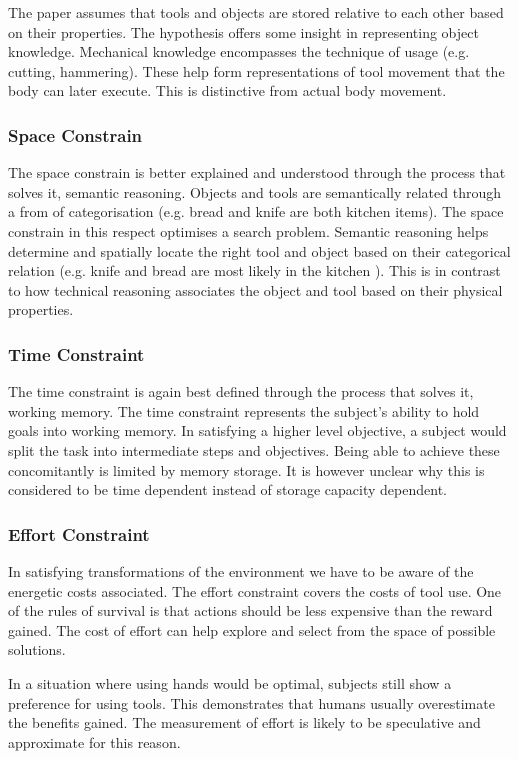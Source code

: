 \documentclass[11]{article}
\begin{document}
The paper assumes that tools and objects are stored relative to each other based on their properties. The hypothesis offers some insight in representing object knowledge. Mechanical knowledge encompasses the technique of usage (e.g. cutting, hammering). These help form representations of tool movement that the body can later execute. This is distinctive from actual body movement. 

\subsubsection*{Space Constrain}
The space constrain is better explained and understood through the process that solves it, semantic reasoning. Objects and tools are semantically related through a from of categorisation (e.g. bread and knife are both kitchen items). The space constrain in this respect optimises a search problem. Semantic reasoning helps determine and spatially locate the right tool and object based on their categorical relation (e.g. knife and bread are most likely in the kitchen ). This is in contrast to how technical reasoning associates the object and tool based on their physical properties.

\subsubsection*{Time Constraint}
The time constraint is again best defined through the process that solves it, working memory. The time constraint represents the subject's ability to hold goals into working memory. In satisfying a higher level objective, a subject would split the task into intermediate steps and objectives. Being able to achieve these concomitantly is limited by memory storage. It is however unclear why this is considered to be time dependent instead of storage capacity dependent. 

\subsubsection*{Effort Constraint}
In satisfying transformations of the environment we have to be aware of the energetic costs associated. The effort constraint covers the costs of tool use. One of the rules of survival is that actions should be less expensive than the reward gained. The cost of effort can help explore and select from the space of possible solutions. 

In a situation where using hands would be optimal, subjects still show a preference for using tools\cite{osiurak2014}. This demonstrates that humans usually overestimate the benefits gained. The measurement of effort is likely to be speculative and approximate for this reason.
\end{document}
